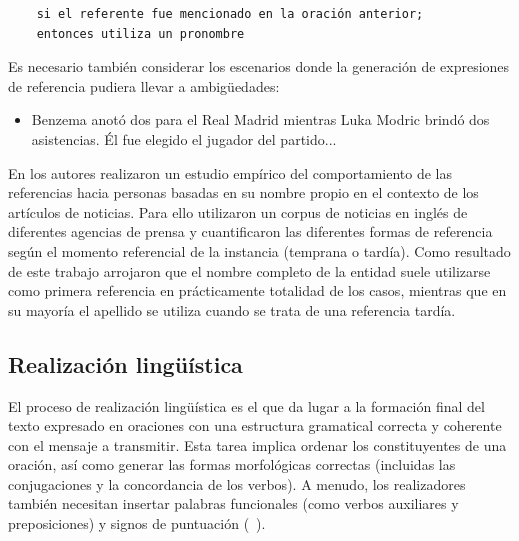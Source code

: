 \begin{verbatim}
    si el referente fue mencionado en la oración anterior;
    entonces utiliza un pronombre
\end{verbatim}

Es necesario también considerar los escenarios donde la generaci\'on de expresiones de referencia pudiera llevar a ambigüedades:

\begin{itemize}
    \item Benzema anotó dos para el Real Madrid mientras Luka Modric brindó dos asistencias. Él fue elegido el jugador del partido... 
\end{itemize}

    En \cite{siddharthan2011information} los autores realizaron un estudio emp\'irico del comportamiento de las referencias hacia personas basadas en 
su nombre propio en el contexto de los art\'iculos de noticias. Para ello utilizaron un corpus de noticias en inglés de diferentes agencias de prensa y 
cuantificaron las diferentes formas de referencia seg\'un el momento referencial de la instancia (temprana o tard\'ia). Como resultado de este trabajo 
arrojaron que el nombre completo de la entidad suele utilizarse como primera referencia en pr\'acticamente totalidad de los casos, mientras que en su mayor\'ia
el apellido se utiliza cuando se trata de una referencia tard\'ia. 


\subsection{Realización lingüística}\label{subsection:realizcion}

    El proceso de realizaci\'on lingüística es el que da lugar a la formaci\'on final del texto expresado en oraciones con una 
estructura gramatical correcta y coherente con el mensaje a transmitir. Esta tarea implica ordenar los constituyentes de una oración, 
así como generar las formas morfológicas correctas (incluidas las conjugaciones y la concordancia de los verbos). A menudo, los 
realizadores también necesitan insertar palabras funcionales (como verbos auxiliares y preposiciones) y signos de puntuación (~\cite{Gatt2018SurveyOT}).
   
